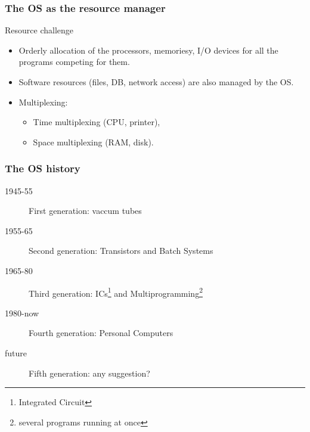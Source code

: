   \begin{frame}
    \frametitle{The OS as the resource manager}
        \begin{block}{Resource challenge}
          \begin{itemize}
            \item Orderly allocation of the processors, memoriesy, I/O devices for all the programs competing for them.
            \item Software resources (files, DB, network access) are also managed by the OS.
            \item Multiplexing:
              \begin{itemize}
                \item Time multiplexing (CPU, printer),
                \item Space multiplexing (RAM, disk).
              \end{itemize}
          \end{itemize}
        \end{block}
  \end{frame}

  \begin{frame}
    \frametitle{The OS history}
        \begin{block}{}
          \begin{description}
            \item[1945-55] First generation: vaccum tubes
            \item[1955-65] Second generation: Transistors and Batch Systems
            \item[1965-80] Third generation: ICs\footnote{Integrated Circuit} and Multiprogramming\footnote{several programs running at once}
            \item[1980-now] Fourth generation: Personal Computers
            \item[future] Fifth generation: any suggestion?
          \end{description}
        \end{block}
  \end{frame}

